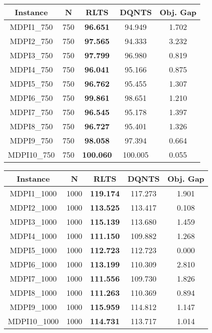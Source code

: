 \begin{center}
  \bigskip
  \begin{tabular}{ c|c|c|c|c }
    \hline
    \textbf{Instance} & \textbf{N} & \textbf{RLTS} & \textbf{DQNTS} & \textbf{Obj. Gap} \\ \hline
    MDPI1\_750 & 750 & \textbf{96.651} & 94.949 & 1.702 \\ \hline
    MDPI2\_750 & 750 & \textbf{97.565} & 94.333 & 3.232 \\ \hline
    MDPI3\_750 & 750 & \textbf{97.799} & 96.980 & 0.819 \\ \hline
    MDPI4\_750 & 750 & \textbf{96.041} & 95.166 & 0.875 \\ \hline
    MDPI5\_750 & 750 & \textbf{96.762} & 95.455 & 1.307 \\ \hline
    MDPI6\_750 & 750 & \textbf{99.861} & 98.651 & 1.210 \\ \hline
    MDPI7\_750 & 750 & \textbf{96.545} & 95.178 & 1.397 \\ \hline
    MDPI8\_750 & 750 & \textbf{96.727} & 95.401 & 1.326 \\ \hline
    MDPI9\_750 & 750 & \textbf{98.058} & 97.394 & 0.664 \\ \hline
    MDPI10\_750 & 750 & \textbf{100.060} & 100.005 & 0.055 \\ \hline
  \end{tabular}
  \bigskip
  \begin{tabular}{ c|c|c|c|c }
    \hline
    \textbf{Instance} & \textbf{N} & \textbf{RLTS} & \textbf{DQNTS} & \textbf{Obj. Gap} \\ \hline
    MDPI1\_1000 & 1000 & \textbf{119.174} & 117.273 & 1.901 \\ \hline
    MDPI2\_1000 & 1000 & \textbf{113.525} & 113.417 & 0.108 \\ \hline
    MDPI3\_1000 & 1000 & \textbf{115.139} & 113.680 & 1.459 \\ \hline
    MDPI4\_1000 & 1000 & \textbf{111.150} & 109.882 & 1.268 \\ \hline
    MDPI5\_1000 & 1000 & \textbf{112.723} & 112.723 & 0.000 \\ \hline
    MDPI6\_1000 & 1000 & \textbf{113.199} & 110.309 & 2.810 \\ \hline
    MDPI7\_1000 & 1000 & \textbf{111.556} & 109.730 & 1.826 \\ \hline
    MDPI8\_1000 & 1000 & \textbf{111.263} & 110.369 & 0.894 \\ \hline
    MDPI9\_1000 & 1000 & \textbf{115.959} & 114.812 & 1.147 \\ \hline
    MDPI10\_1000 & 1000 & \textbf{114.731} & 113.717 & 1.014 \\ \hline

\end{tabular}
\end{center}
